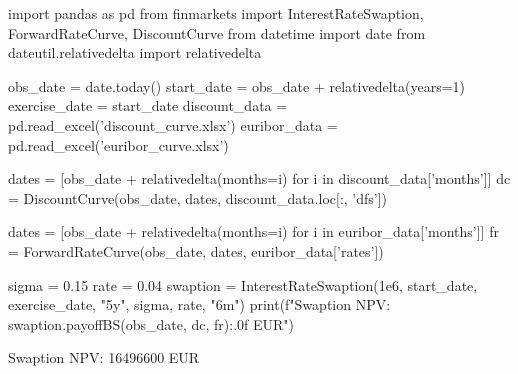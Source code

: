 \cprotEnv\begin{solution}
\begin{ipython}
import pandas as pd
from finmarkets import InterestRateSwaption, ForwardRateCurve, DiscountCurve
from datetime import date
from dateutil.relativedelta import relativedelta

obs_date = date.today()
start_date = obs_date + relativedelta(years=1)
exercise_date = start_date
discount_data = pd.read_excel('discount_curve.xlsx')
euribor_data = pd.read_excel('euribor_curve.xlsx')


dates = [obs_date + relativedelta(months=i) for i in discount_data['months']]
dc = DiscountCurve(obs_date, dates, discount_data.loc[:, 'dfs'])

dates = [obs_date + relativedelta(months=i) for i in euribor_data['months']]
fr = ForwardRateCurve(obs_date, dates, euribor_data['rates'])

sigma = 0.15
rate = 0.04
swaption = InterestRateSwaption(1e6, start_date, exercise_date,
                                "5y", sigma, rate, "6m")
print(f"Swaption NPV: {swaption.payoffBS(obs_date, dc, fr):.0f} EUR")
\end{ipython}
\begin{ioutput}
Swaption NPV: 16496600 EUR
\end{ioutput}
\end{solution}

